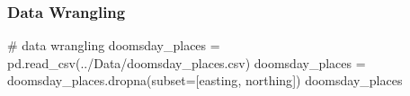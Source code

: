 \documentclass[
  11pt,
  letterpaper,
  DIV=11,
  numbers=noendperiod]{scrartcl}
\newenvironment{Shaded}{\begin{snugshade}}{\end{snugshade}}
\newcommand{\CommentTok}[1]{\textcolor[rgb]{0.37,0.37,0.37}{#1}}
\newcommand{\NormalTok}[1]{\textcolor[rgb]{0.00,0.23,0.31}{#1}}
\newcommand{\OperatorTok}[1]{\textcolor[rgb]{0.37,0.37,0.37}{#1}}
\newcommand{\StringTok}[1]{\textcolor[rgb]{0.13,0.47,0.30}{#1}}
\begin{document}
\subsubsection{Data Wrangling}\label{data-wrangling-1}

\begin{Shaded}
\begin{Highlighting}[]
\CommentTok{\# data wrangling}
\NormalTok{doomsday\_places }\OperatorTok{=}\NormalTok{ pd.read\_csv(}\StringTok{\textquotesingle{}../Data/doomsday\_places.csv\textquotesingle{}}\NormalTok{)}
\NormalTok{doomsday\_places }\OperatorTok{=}\NormalTok{ doomsday\_places.dropna(subset}\OperatorTok{=}\NormalTok{[}\StringTok{\textquotesingle{}easting\textquotesingle{}}\NormalTok{, }\StringTok{\textquotesingle{}northing\textquotesingle{}}\NormalTok{])}
\NormalTok{doomsday\_places}
\end{Highlighting}
\end{Shaded}
\end{document}
